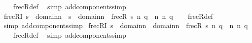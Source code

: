 \begin{isabellebody}
%
\isadelimproof
\ \ %
\endisadelimproof
%
\isatagproof
{}\isamarkupfalse%
\ frecR{\isacharunderscore}{\kern0pt}def\ \isamarkupfalse%
\ {\isacharparenleft}{\kern0pt}simp\ add{\isacharcolon}{\kern0pt}components{\isacharunderscore}{\kern0pt}simp{\isacharparenright}{\kern0pt}%
\endisatagproof
{\isafoldproof}%
%
\isadelimproof
\isanewline
%
\endisadelimproof
\isanewline
{}\isamarkupfalse%
\ frecRI{}{\isacharcolon}{\kern0pt}\ {\isachardoublequoteopen}s\ {\isasymin}\ domain{\isacharparenleft}{\kern0pt}n{}{\isacharparenright}{\kern0pt}\ {\isasymor}\ s\ {\isasymin}\ domain{\isacharparenleft}{\kern0pt}n{}{\isacharparenright}{\kern0pt}\ {\isasymLongrightarrow}\ frecR{\isacharparenleft}{\kern0pt}{\isasymlangle}{}{\isacharcomma}{\kern0pt}\ s{\isacharcomma}{\kern0pt}\ n{}{\isacharcomma}{\kern0pt}\ q{\isasymrangle}{\isacharcomma}{\kern0pt}\ {\isasymlangle}{}{\isacharcomma}{\kern0pt}\ n{}{\isacharcomma}{\kern0pt}\ n{}{\isacharcomma}{\kern0pt}\ q{\isacharprime}{\kern0pt}{\isasymrangle}{\isacharparenright}{\kern0pt}{\isachardoublequoteclose}\isanewline
%
\isadelimproof
\ \ %
\endisadelimproof
%
\isatagproof
{}\isamarkupfalse%
\ frecR{\isacharunderscore}{\kern0pt}def\ \isamarkupfalse%
\ {\isacharparenleft}{\kern0pt}simp\ add{\isacharcolon}{\kern0pt}components{\isacharunderscore}{\kern0pt}simp{\isacharparenright}{\kern0pt}%
\endisatagproof
{\isafoldproof}%
%
\isadelimproof
\isanewline
%
\endisadelimproof
\isanewline
{}\isamarkupfalse%
\ frecRI{}{\isacharprime}{\kern0pt}{\isacharcolon}{\kern0pt}\ {\isachardoublequoteopen}s\ {\isasymin}\ domain{\isacharparenleft}{\kern0pt}n{}{\isacharparenright}{\kern0pt}\ {\isasymunion}\ domain{\isacharparenleft}{\kern0pt}n{}{\isacharparenright}{\kern0pt}\ {\isasymLongrightarrow}\ frecR{\isacharparenleft}{\kern0pt}{\isasymlangle}{}{\isacharcomma}{\kern0pt}\ s{\isacharcomma}{\kern0pt}\ n{}{\isacharcomma}{\kern0pt}\ q{\isasymrangle}{\isacharcomma}{\kern0pt}\ {\isasymlangle}{}{\isacharcomma}{\kern0pt}\ n{}{\isacharcomma}{\kern0pt}\ n{}{\isacharcomma}{\kern0pt}\ q{\isacharprime}{\kern0pt}{\isasymrangle}{\isacharparenright}{\kern0pt}{\isachardoublequoteclose}\isanewline
%
\isadelimproof
\ \ %
\endisadelimproof
%
\isatagproof
{}\isamarkupfalse%
\ frecR{\isacharunderscore}{\kern0pt}def\ \isamarkupfalse%
\ {\isacharparenleft}{\kern0pt}simp\ add{\isacharcolon}{\kern0pt}components{\isacharunderscore}{\kern0pt}simp{\isacharparenright}{\kern0pt}%

\end{isabellebody}
